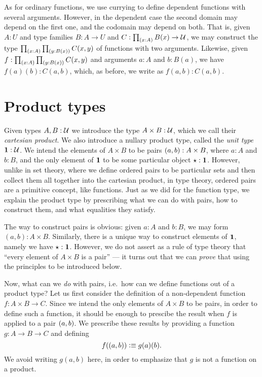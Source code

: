 As for ordinary functions, we use currying to define dependent functions with
several arguments. However, in the dependent case the second domain may
depend on the first one, and the codomain may depend on both. That is,
given $A:U$ and type families $B : A \to U$ and $C : \prd{x:A}B(x) \to \UU$, we may construct
the type $\prd{x:A}{y : B(x)} C(x,y)$ of functions with two
arguments.  Likewise, given $f:\prd{x:A}{y : B(x)} C(x,y)$ and arguments $a:A$ and $b:B(a)$, we have $f(a)(b) : C(a,b)$, which,
as before, we write as $f(a,b) : C(a,b)$.



\section{Product types}
\label{sec:finite-product-types}

Given types $A,B:\mathcal{U}$ we introduce the type $A\times B:\mathcal{U}$, which we call their \emph{cartesian product}.
We also introduce a nullary product type, called the \emph{unit type} $\mathbf{1} : \mathcal{U}$.
We intend the elements of $A\times B$ to be pairs $( a,b) : A \times B$, where $a:A$ and $b:B$, and the only element of $\mathbf{1}$ to be some particular object $\star : \mathbf{1}$.
However, unlike in set theory, where we define ordered pairs to be particular sets and then collect them all together into the cartesian product, in type theory, ordered pairs are a primitive concept, like functions.
Just as we did for the function type, we explain the product type by prescribing what we can do with pairs, how to construct them, and what equalities they satisfy.

The way to construct pairs is obvious: given $a:A$ and $b:B$, we may form $(a,b):A\times B$.
Similarly, there is a unique way to construct elements of $\mathbf{1}$, namely we have $\star:\mathbf{1}$.
However, we do not assert as a rule of type theory that ``every element of $A\times B$ is a pair'' --- it turns out that we can \emph{prove} that using the principles to be introduced below.

Now, what can we \emph{do} with pairs, i.e.\ how can we define functions out of a product type?
Let us first consider the definition of a non-dependent function $f : A\times B \to C$.
Since we intend the only elements of $A\times B$ to be pairs, in order to define such a function, it should be enough to prescibe the result
when $f$ is applied to a pair $( a,b)$.  We prescribe these results by
providing a function $g : A \to B \to C$ and defining
\[ f(( a,b)) \vcentcolon\equiv g(a)(b). \]
We avoid writing $g(a,b)$ here, in order to emphasize that $g$ is not a
function on a product. 

